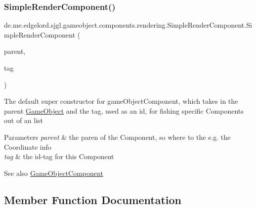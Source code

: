 \subsubsection{\texorpdfstring{Simple\+Render\+Component()}{SimpleRenderComponent()}}
{\footnotesize\ttfamily de.\+me.\+edgelord.\+sjgl.\+gameobject.\+components.\+rendering.\+Simple\+Render\+Component.\+Simple\+Render\+Component (\begin{DoxyParamCaption}\item[{\mbox{\hyperlink{classde_1_1me_1_1edgelord_1_1sjgl_1_1gameobject_1_1_game_object}{Game\+Object}}}]{parent,  }\item[{String}]{tag }\end{DoxyParamCaption})}

The default super constructor for game\+Object\+Component, which takes in the parent \mbox{\hyperlink{classde_1_1me_1_1edgelord_1_1sjgl_1_1gameobject_1_1_game_object}{Game\+Object}} and the tag, used as an id, for fishing specific Components out of an list


\begin{DoxyParams}{Parameters}
{\em parent} & the paren of the Component, so where to the e.\+g. the Coordinate info \\
\hline
{\em tag} & the id-\/tag for this Component \\
\hline
\end{DoxyParams}
\begin{DoxySeeAlso}{See also}
\mbox{\hyperlink{classde_1_1me_1_1edgelord_1_1sjgl_1_1gameobject_1_1_game_object_component}{Game\+Object\+Component}} 
\end{DoxySeeAlso}


\subsection{Member Function Documentation}
\mbox{\label{classde_1_1me_1_1edgelord_1_1sjgl_1_1gameobject_1_1components_1_1rendering_1_1_simple_render_component_a7513032b4d5bfe60626f40e7fc6234e6}} 
